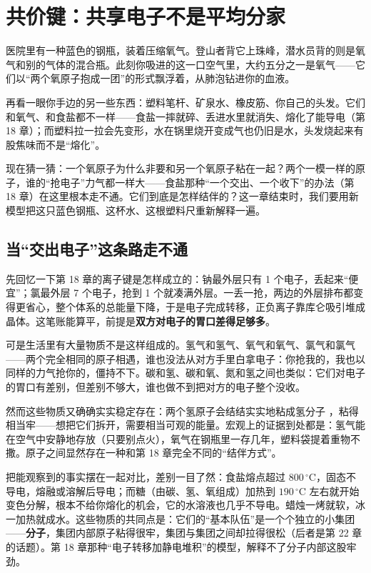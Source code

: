 \chapter{共价键：共享电子不是平均分家}

\begin{kaichang}
医院里有一种蓝色的钢瓶，装着压缩氧气。登山者背它上珠峰，潜水员背的则是氧气和别的气体的混合瓶。此刻你吸进的这一口空气里，大约五分之一是氧气——它们以“两个氧原子抱成一团”的形式飘浮着，从肺泡钻进你的血液。

再看一眼你手边的另一些东西：塑料笔杆、矿泉水、橡皮筋、你自己的头发。它们和氧气、和食盐都不一样——食盐一摔就碎、丢进水里就消失、熔化了能导电（第 18 章）；而塑料拉一拉会先变形，水在锅里烧开变成气也仍旧是水，头发烧起来有股焦味而不是“熔化”。

现在猜一猜：一个氧原子为什么非要和另一个氧原子粘在一起？两个一模一样的原子，谁的“抢电子”力气都一样大——食盐那种“一个交出、一个收下”的办法（第 18 章）在这里根本走不通。它们到底是怎样结伴的？这一章结束时，我们要用新模型把这只蓝色钢瓶、这杯水、这根塑料尺重新解释一遍。
\end{kaichang}

\section{当“交出电子”这条路走不通}

先回忆一下第 18 章的离子键是怎样成立的：钠最外层只有 1 个电子，丢起来“便宜”；氯最外层 7 个电子，抢到 1 个就凑满外层。一丢一抢，两边的外层排布都变得更省心，整个体系的总能量下降，于是电子完成转移，正负离子靠库仑吸引堆成晶体。这笔账能算平，前提是\textbf{双方对电子的胃口差得足够多}。

可是生活里有大量物质不是这样组成的。氢气和氢气、氧气和氧气、氯气和氯气——两个完全相同的原子相遇，谁也没法从对方手里白拿电子：你抢我的，我也以同样的力气抢你的，僵持不下。碳和氢、碳和氧、氮和氢之间也类似：它们对电子的胃口有差别，但差别不够大，谁也做不到把对方的电子整个没收。

然而这些物质又确确实实稳定存在：两个氢原子会结结实实地粘成氢分子 ，粘得相当牢——想把它们拆开，需要相当可观的能量。宏观上的证据到处都是：氢气能在空气中安静地存放（只要别点火），氧气在钢瓶里一存几年，塑料袋提着重物不撒。原子之间显然存在一种和第 18 章完全不同的“结伴方式”。

把能观察到的事实摆在一起对比，差别一目了然：食盐熔点超过 $800\,^{\circ}\mathrm{C}$，固态不导电，熔融或溶解后导电；而糖（由碳、氢、氧组成）加热到 $190\,^{\circ}\mathrm{C}$ 左右就开始变色分解，根本不给你熔化的机会，它的水溶液也几乎不导电。蜡烛一烤就软，冰一加热就成水。这些物质的共同点是：它们的“基本队伍”是一个个独立的小集团——\textbf{分子}，集团内部原子粘得很牢，集团与集团之间却拉得很松（后者是第 22 章的话题）。第 18 章那种“电子转移加静电堆积”的模型，解释不了分子内部这股牢劲。

